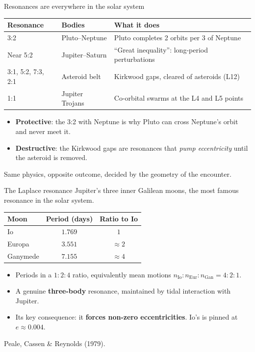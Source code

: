 \documentclass[aspectratio=169, 11pt]{beamer}
\begin{document}
\begin{frame}{Resonances are everywhere in the solar system}
  \centering
  \footnotesize
  \begin{tabular}{lll}
    \toprule
    Resonance & Bodies & What it does \\
    \midrule
    3:2               & Pluto--Neptune    & Pluto completes 2 orbits per 3 of Neptune \\
    Near 5:2          & Jupiter--Saturn   & ``Great inequality'': long-period perturbations \\
    3:1, 5:2, 7:3, 2:1& Asteroid belt     & Kirkwood gaps, cleared of asteroids (L12) \\
    1:1               & Jupiter Trojans   & Co-orbital swarms at the L4 and L5 points \\
    \bottomrule
  \end{tabular}
  \vskip10pt\relax
  \normalsize
  \begin{itemize}
    \item \textbf{Protective}: the 3:2 with Neptune is why Pluto can cross Neptune's orbit and never meet it.
    \item \textbf{Destructive}: the Kirkwood gaps are resonances that \emph{pump eccentricity} until the asteroid is removed.
  \end{itemize}
  \vskip2pt\relax
  Same physics, opposite outcome, decided by the geometry of the encounter.
\end{frame}

\begin{frame}{The Laplace resonance}
  Jupiter's three inner Galilean moons, the most famous resonance in the solar system.
  \vskip4pt\relax
  \centering
  \footnotesize
  \begin{tabular}{lcc}
    \toprule
    Moon & Period (days) & Ratio to Io \\
    \midrule
    Io       & $1.769$ & $1$ \\
    Europa   & $3.551$ & $\approx 2$ \\
    Ganymede & $7.155$ & $\approx 4$ \\
    \bottomrule
  \end{tabular}
  \vskip8pt\relax
  \normalsize
  \begin{itemize}
    \item Periods in a $1 : 2 : 4$ ratio, equivalently mean motions $n_{\mathrm{Io}} : n_{\mathrm{Eur}} : n_{\mathrm{Gan}} = 4 : 2 : 1$.
    \item A genuine \textbf{three-body} resonance, maintained by tidal interaction with Jupiter.
    \item Its key consequence: it \textbf{forces non-zero eccentricities}. Io's is pinned at $e \approx 0.004$.
  \end{itemize}
  \vskip2pt\relax
  {\footnotesize Peale, Cassen \& Reynolds (1979).}
\end{frame}
\end{document}
